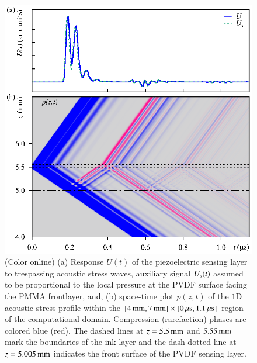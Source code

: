 \documentclass[5p,times,twocolumn]{elsarticle}
\begin{document}
\begin{figure}[t!]
\begin{center}
\includegraphics[width=1.0\linewidth]{./FIGS/stressMonitor_pzt.eps}
\end{center}
\caption{
(Color online) (a) Response $U(t)$ of the piezoelectric sensing layer to
trespassing acoustic stress waves, auxiliary signal $U_{\rm s}(t)$ assumed to
be proportional to the local pressure at the PVDF surface facing the PMMA
frontlayer, and, (b) space-time plot $p(z,t)$ of the $1$D acoustic stress
profile within the $[4\,{\rm{mm}},7\,{\rm{mm}}]\times[0\,{\rm{\mu
s}},1.1\,{\rm{\mu s}}]$ region of the computational domain.
Compression (rarefaction) phases are colored blue (red). 
The dashed lines at $z=5.5\,{\rm{mm}}$ and $5.55\,{\rm{mm}}$
 mark the boundaries of the ink layer and the dash-dotted line at 
$z=5.005\,{\rm{mm}}$ indicates the front surface of the PVDF sensing layer.
\label{fig:pzt}}
\end{figure}  
\end{document}
